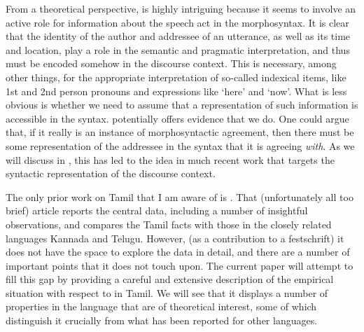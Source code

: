 \documentclass[output=paper, modfonts, nonflat]{langsci/langscibook}
\begin{document}
From a theoretical perspective, \allagr{} is highly intriguing because
it seems to involve an active role for information about the speech
act in the morphosyntax. It is clear that the identity of the author
and addressee of an utterance, as well as its time and location, play
a role in the semantic and pragmatic interpretation, and thus must be
encoded somehow in the discourse context. This is necessary, among
other things, for the appropriate interpretation of so-called
indexical items, like 1st and 2nd person pronouns and expressions like
`here' and `now'. What is less obvious is whether we need to assume
that a representation of such information is accessible in the
syntax. \allagr{} potentially offers evidence that we do. One could
argue that, if it really is an instance of morphosyntactic agreement,
then there must be some representation of the addressee in the syntax
that it is agreeing \emph{with}. As we will discuss in
, this has led to the idea in much recent work
that \allagr{} targets the syntactic representation of the discourse
context.


The only prior work on \allagr{} Tamil that I am aware of is
\citet{amrit:1991}. That (unfortunately all too brief) article reports
the central data, including a number of insightful observations, and
compares the Tamil facts with those in the closely related languages
Kannada and Telugu. However, (as a contribution to a festschrift) it
does not have the space to explore the data in detail, and there are a
number of important points that it does not touch upon. The current
paper will attempt to fill this gap by providing a careful and
extensive description of the empirical situation with respect to
\allagr{} in Tamil. We will see that it displays a number of
properties in the language that are of theoretical interest, some of
which distinguish it crucially from what has been reported for other
languages.
\end{document}
